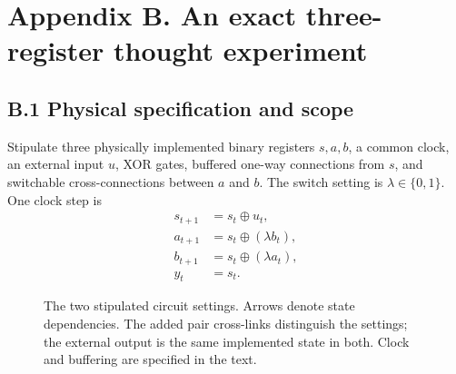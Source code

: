 \documentclass[
  11pt,
  a4paper,
]{article}
\begin{document}
\hypertarget{appendix-b.-an-exact-three-register-thought-experiment}{%
\clearpage
\section{Appendix B. An exact three-register thought
experiment}\label{appendix-b.-an-exact-three-register-thought-experiment}}

\hypertarget{b.1-physical-specification-and-scope}{%
\subsection{B.1 Physical specification and
scope}\label{b.1-physical-specification-and-scope}}

Stipulate three physically implemented binary registers \(s,a,b\), a
common clock, an external input \(u\), XOR gates, buffered one-way
connections from \(s\), and switchable cross-connections between \(a\)
and \(b\). The switch setting is \(\lambda\in\{0,1\}\). One clock step
is
\nopagebreak[4]
\[
\begin{aligned}
s_{t+1}&=s_t\oplus u_t,\\
a_{t+1}&=s_t\oplus(\lambda b_t),\\
b_{t+1}&=s_t\oplus(\lambda a_t),\\
y_t&=s_t.
\end{aligned}
\]

\begin{figure}[htbp]
\centering
{}
\caption{The two stipulated circuit settings. Arrows denote state dependencies. The added pair cross-links distinguish the settings; the external output is the same implemented state in both. Clock and buffering are specified in the text.}
\end{figure}
\end{document}

